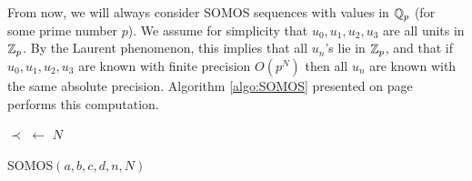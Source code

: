 \documentclass{lms}
\begin{document}
From now, we will always consider SOMOS sequences with values in $\mathbb Q_p$ 
(for some prime number $p$). We assume for simplicity that $u_0, u_1, u_2, 
u_3$ are all units in $\mathbb Z_p$. By the Laurent phenomenon, this implies 
that all $u_n$'s lie in $\mathbb Z_p$, and that if $u_0, u_1, u_2, u_3$ 
are known with finite precision $O(p^N)$ then all $u_n$ are 
known with the same absolute precision. Algorithm \ref{algo:SOMOS} presented on 
page \pageref{algo:SOMOS} performs this computation.

\begin{algorithm}[t]
\BlankLine
$\prec$ $\leftarrow$ $N$\;
\;
\caption{\sc SOMOS$(a, b, c, d, n, N)$}\label{algo:SOMOS}
\end{algorithm}
\end{document}
